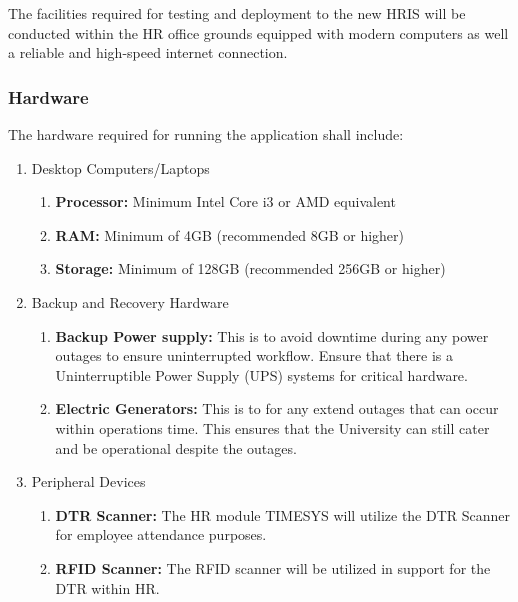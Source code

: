         The facilities required for testing and deployment to the new HRIS will be conducted within the HR office grounds equipped with modern computers as well a reliable and high-speed internet connection.

        \subsubsection{Hardware}

        The hardware required for running the application shall include:

        \begin{enumerate}
            \item Desktop Computers/Laptops
            \begin{enumerate}
                \item \textbf{Processor:} Minimum Intel Core i3 or AMD equivalent
                \item \textbf{RAM:} Minimum of 4GB (recommended 8GB or higher)
                \item \textbf{Storage:} Minimum of 128GB (recommended 256GB or higher)
            \end{enumerate}
            
            \item Backup and Recovery Hardware
            \begin{enumerate}
                \item \textbf{Backup Power supply:} This is to avoid downtime during any power outages to ensure uninterrupted workflow. Ensure that there is a Uninterruptible Power Supply (UPS) systems for critical hardware.
                
                \item \textbf{Electric Generators:} This is to for any extend outages that can occur within operations time. This ensures that the University can still cater and be operational despite the outages.
            \end{enumerate}
            
            \item Peripheral Devices
            \begin{enumerate}
                \item \textbf{DTR Scanner:} The HR module TIMESYS will utilize the DTR Scanner for employee attendance purposes.
                \item \textbf{RFID Scanner:} The RFID scanner will be utilized in support for the DTR within HR.
            \end{enumerate}
            
        \end{enumerate}

